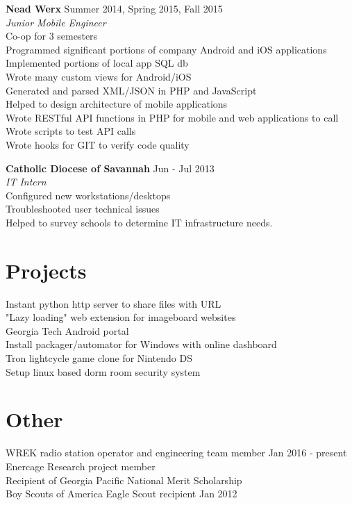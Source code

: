 \documentclass[line, margin]{resume}
\begin{document}
\textbf{Nead Werx} \hfill Summer 2014, Spring 2015, Fall 2015 \\
\textit{Junior Mobile Engineer} \\
Co-op for 3 semesters \\
Programmed significant portions of company Android and iOS applications \\
Implemented portions of local app SQL db \\
Wrote many custom views for Android/iOS \\
Generated and parsed XML/JSON in PHP and JavaScript \\
Helped to design architecture of mobile applications\\
Wrote RESTful API functions in PHP for mobile and web applications to call \\
Wrote scripts to test API calls \\
Wrote hooks for GIT to verify code quality

\textbf{Catholic Diocese of Savannah} \hfill Jun - Jul 2013 \\
\textit{IT Intern} \\
Configured new workstations/desktops \\
Troubleshooted user technical issues \\
Helped to survey schools to determine IT infrastructure needs.

\section{Projects}
Instant python http server to share files with URL\\
"Lazy loading" web extension for imageboard websites \\
Georgia Tech Android portal \\
Install packager/automator for Windows with online dashboard\\
Tron lightcycle game clone for Nintendo DS \\
Setup linux based dorm room security system 

\section{Other}
WREK radio station operator and engineering team member \hfill Jan 2016 - present \\
Enercage Research project member\\
Recipient of Georgia Pacific National Merit Scholarship \\
Boy Scouts of America Eagle Scout recipient \hfill Jan 2012 \\
\end{document}
